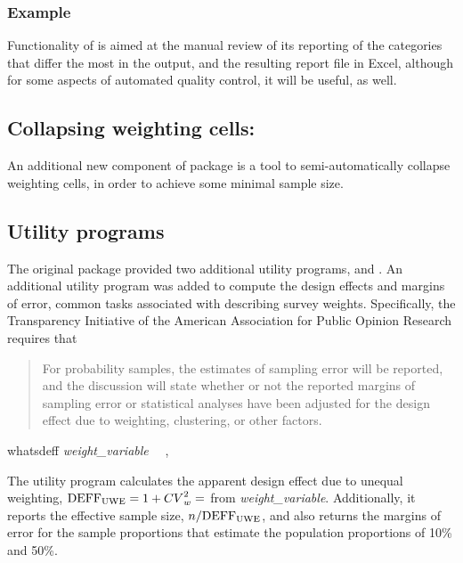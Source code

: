 \subsubsection{Example}

\begin{stlog}
\nullskip
\end{stlog}

Functionality of  is aimed at the manual review 
of its reporting of the categories that differ the most in the output,
and the resulting report file in Excel,
although for some aspects of automated quality control, it will be useful, as well.

\subsection{Collapsing weighting cells:  }

An additional new component of  package is a tool to 
semi-automatically collapse weighting cells, in order to achieve
some minimal sample size.

\subsection{Utility programs}

The original package  provided two additional utility programs,
 and . An additional utility program was added
to compute the design effects and margins of error, common tasks associated
with describing survey weights. Specifically, the Transparency Initiative
of the American Association for Public Opinion Research
\citep{aapor:2014:ti:terms}
requires that

\begin{quote}
For probability samples, the estimates of sampling error will be reported, and the discussion will state whether or not the reported margins of sampling error or statistical analyses have been adjusted for the design effect due to weighting, clustering, or other factors.
\end{quote}

\begin{stsyntax}
whatsdeff
{\it weight\_variable}
\optif\
\optin\
,
\end{stsyntax}

The utility program  calculates the apparent design effect due to unequal weighting,
${\rm DEFF_{UWE}}=1 + {CV}^2_w = $  from  {\it weight\_variable}.
Additionally, it reports the effective sample size, $n/{\rm DEFF_{UWE}}$, and also returns
the margins of error for the sample proportions that estimate the population proportions of
10\% and 50\%.

